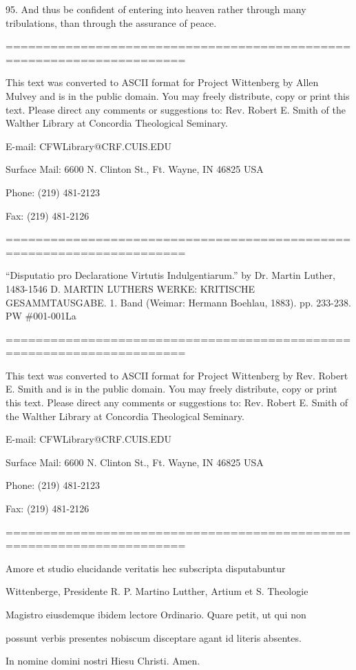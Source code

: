 95. And thus be confident of entering into heaven rather through many
tribulations, than through the assurance of peace.

======================================================================

This text was converted to ASCII format for Project Wittenberg by
Allen Mulvey and is in the public domain. You may freely
distribute, copy or print this text. Please direct any comments
or suggestions to: Rev. Robert E. Smith of the Walther Library at
Concordia Theological Seminary.

E-mail: CFWLibrary@CRF.CUIS.EDU

Surface Mail: 6600 N. Clinton St., Ft. Wayne, IN 46825 USA

Phone: (219) 481-2123

Fax: (219) 481-2126

======================================================================

``Disputatio pro Declaratione Virtutis Indulgentiarum.''
by Dr. Martin Luther, 1483-1546
D. MARTIN LUTHERS WERKE: KRITISCHE GESAMMTAUSGABE.
1. Band (Weimar: Hermann Boehlau, 1883). pp. 233-238.
PW \#001-001La

======================================================================

This text was converted to ASCII format for Project Wittenberg by
Rev. Robert E. Smith and is in the public domain. You may freely
distribute, copy or print this text. Please direct any comments
or suggestions to: Rev. Robert E. Smith of the Walther Library at
Concordia Theological Seminary.

E-mail: CFWLibrary@CRF.CUIS.EDU

Surface Mail: 6600 N. Clinton St., Ft. Wayne, IN 46825 USA

Phone: (219) 481-2123

Fax: (219) 481-2126

======================================================================

Amore et studio elucidande veritatis hec subscripta disputabuntur

Wittenberge, Presidente R. P. Martino Lutther, Artium et S. Theologie

Magistro eiusdemque ibidem lectore Ordinario. Quare petit, ut qui non

possunt verbis presentes nobiscum disceptare agant id literis absentes.

In nomine domini nostri Hiesu Christi. Amen.

